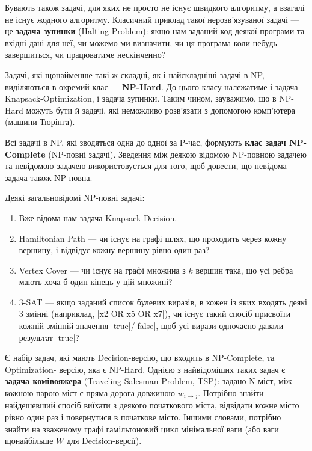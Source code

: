\documentclass[12pt,a4paper]{report}
\begin{document}
Бувають також задачі, для яких не просто не існує швидкого алгоритму, а взагалі не існує жодного алгоритму. Класичний приклад такої нерозв’язуваної задачі --- це \textbf{задача зупинки} (Halting Problem): якщо нам заданий код деякої програми та вхідні дані для неї, чи можемо ми визначити, чи ця програма коли-небудь завершиться, чи працюватиме нескінченно?

Задачі, які щонайменше такі ж складні, як і найскладніші задачі в NP, виділяються в окремий клас --- \textbf{NP-Hard}. До цього класу належатиме і задача Knapsack-Optimization, і задача зупинки. Таким чином, зауважимо, що в NP-Hard можуть бути й задачі, які неможливо розв’язати з допомогою комп’ютера (машини Тюрінга).

Всі задачі в NP, які зводяться одна до одної за P-час, формують \textbf{клас задач NP-Complete} (NP-повні задачі). Зведення між деякою відомою NP-повною задачею та невідомою задачею використовується для того, щоб довести, що невідома задача також NP-повна.

Деякі загальновідомі NP-повні задачі:

\begin{enumerate}
    \item Вже відома нам задача Knapsack-Decision.
    \item Hamiltonian Path --- чи існує на графі шлях, що проходить через кожну вершину, і відвідує кожну вершину рівно один раз?
    \item Vertex Cover --- чи існує на графі множина з \(k\) вершин така, що усі ребра мають хоча б один кінець у цій множині?
    \item 3-SAT --- якщо заданий список булевих виразів, в кожен із яких входять деякі 3 змінні (наприклад, |x2 OR x5 OR x7|), чи існує такий спосіб присвоїти кожній змінній значення |true|/|false|, щоб усі вирази одночасно давали результат |true|?
\end{enumerate}

Є набір задач, які мають Decision-версію, що входить в NP-Complete, та Optimization- версію, яка є NP-Hard. Однією з найвідоміших таких задач є \textbf{задача комівояжера} (Traveling Salesman Problem, TSP): задано N міст, між кожною парою міст є пряма дорога довжиною \(w_{i \rightarrow j}\). Потрібно знайти найдешевший спосіб виїхати з деякого початкового міста, відвідати кожне місто рівно один раз і повернутися в початкове місто. Іншими словами, потрібно знайти на зваженому графі гамільтоновий цикл мінімальної ваги (або ваги щонайбільше \(W\) для Decision-версії).
\end{document}
